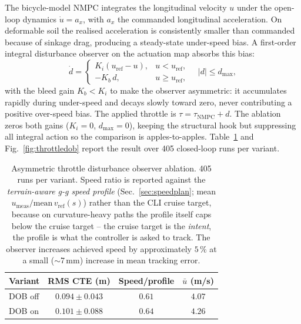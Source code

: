 \documentclass[conference,letterpaper,10pt]{IEEEtran}
\begin{document}
The bicycle-model NMPC integrates the longitudinal velocity $u$
under the open-loop dynamics $\dot u\!=\!a_x$, with $a_x$ the
commanded longitudinal acceleration. On deformable soil the realised
acceleration is consistently smaller than commanded because of
sinkage drag, producing a steady-state under-speed bias. A
first-order integral disturbance observer on the actuation map
absorbs this bias:
\begin{equation}
  \dot d = \begin{cases}
    K_i (u_{\mathrm{ref}} - u), & u < u_{\mathrm{ref}},\\
    -K_b\, d,                   & u \ge u_{\mathrm{ref}},
  \end{cases}
  \quad |d| \le d_{\max},
\end{equation}
with the bleed gain $K_b\!<\!K_i$ to make the observer asymmetric: it
accumulates rapidly during under-speed and decays slowly toward zero,
never contributing a positive over-speed bias. The applied throttle
is $\tau\!=\!\tau_{\mathrm{NMPC}}\!+\!d$. The ablation zeros both
gains ($K_i\!=\!0$, $d_{\max}\!=\!0$), keeping the structural hook
but suppressing all integral action so the comparison is
apples-to-apples. Table~\ref{tab:throttledob} and
Fig.~\ref{fig:throttledob} report the result over 405 closed-loop
runs per variant.

\begin{table}[!t]
  \renewcommand{\arraystretch}{1.15}
  \caption{Asymmetric throttle disturbance observer ablation.
    405 runs per variant. Speed ratio is reported against the
    \emph{terrain-aware g-g speed profile} (Sec.~\ref{sec:speedplan};
    mean $u_\mathrm{meas}/\mathrm{mean}\,v_\mathrm{ref}(s)$) rather than the
    CLI cruise target, because on curvature-heavy paths the profile
    itself caps below the cruise target -- the cruise target is the
    \emph{intent}, the profile is what the controller is
    asked to track. The observer increases achieved speed by approximately
    $5\,\%$ at a small ($\sim$7\,mm) increase in mean tracking error.}
  \label{tab:throttledob}
  \centering
  \setlength{\tabcolsep}{4pt}
  \begin{tabular}{lccc}
    \toprule
    \textbf{Variant} & \textbf{RMS CTE (m)} & \textbf{Speed/profile} & \textbf{$\bar u$ (m/s)}\\
    \midrule
    DOB off & $0.094 \pm 0.043$ & $0.61$ & $4.07$\\
    DOB on  & $0.101 \pm 0.088$ & $\mathbf{0.64}$ & $\mathbf{4.26}$\\
    \bottomrule
  \end{tabular}
\end{table}
\end{document}
